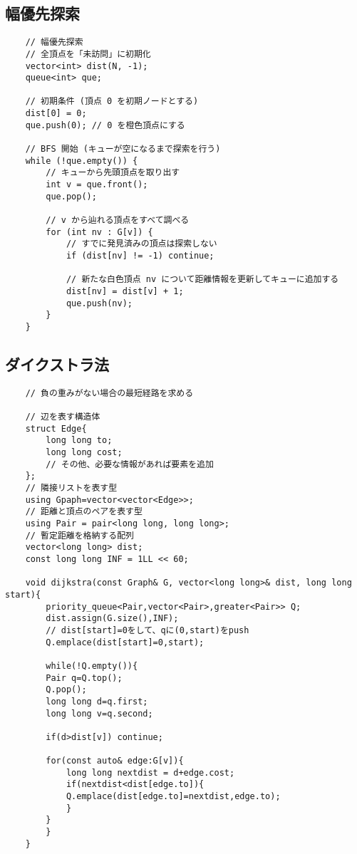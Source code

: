 \documentclass[a4paper, landscape, 9pt]{jarticle} %
\begin{document}
\begin{multicols*}{3}
    \subsection{幅優先探索}
    \begin{lstlisting}
    // 幅優先探索
    // 全頂点を「未訪問」に初期化
    vector<int> dist(N, -1); 
    queue<int> que;

    // 初期条件 (頂点 0 を初期ノードとする)
    dist[0] = 0;
    que.push(0); // 0 を橙色頂点にする

    // BFS 開始 (キューが空になるまで探索を行う)
    while (!que.empty()) {
        // キューから先頭頂点を取り出す
        int v = que.front(); 
        que.pop();

        // v から辿れる頂点をすべて調べる
        for (int nv : G[v]) {
            // すでに発見済みの頂点は探索しない
            if (dist[nv] != -1) continue; 

            // 新たな白色頂点 nv について距離情報を更新してキューに追加する
            dist[nv] = dist[v] + 1;
            que.push(nv);
        }
    }
    \end{lstlisting}

    \subsection{ダイクストラ法}
    \begin{lstlisting}
    // 負の重みがない場合の最短経路を求める

    // 辺を表す構造体
    struct Edge{
        long long to;
        long long cost;
        // その他、必要な情報があれば要素を追加
    };
    // 隣接リストを表す型
    using Gpaph=vector<vector<Edge>>;
    // 距離と頂点のペアを表す型
    using Pair = pair<long long, long long>; 
    // 暫定距離を格納する配列
    vector<long long> dist; 
    const long long INF = 1LL << 60;
    
    void dijkstra(const Graph& G, vector<long long>& dist, long long start){
        priority_queue<Pair,vector<Pair>,greater<Pair>> Q;
        dist.assign(G.size(),INF);
        // dist[start]=0をして、qに(0,start)をpush
        Q.emplace(dist[start]=0,start); 
    
        while(!Q.empty()){
        Pair q=Q.top();
        Q.pop();
        long long d=q.first;
        long long v=q.second;
    
        if(d>dist[v]) continue;
    
        for(const auto& edge:G[v]){
            long long nextdist = d+edge.cost;
            if(nextdist<dist[edge.to]){
            Q.emplace(dist[edge.to]=nextdist,edge.to);
            }
        }
        }
    }
    \end{lstlisting}


\end{multicols*}
\end{document}
